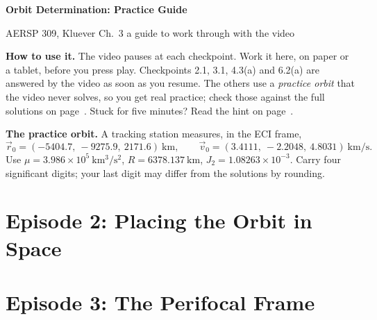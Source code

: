 \documentclass[11pt]{article}
\newcommand{\km}{\ \mathrm{km}}
\newcommand{\kms}{\ \mathrm{km/s}}
\begin{document}
{\LARGE\bfseries Orbit Determination: Practice Guide}\par
{\color{mtkmuted} AERSP 309, Kluever Ch.~3 \textperiodcentered{} a guide to work through with the video}\par\medskip

\textbf{How to use it.} The video pauses at each checkpoint. Work it here, on paper or a tablet, before you
press play. Checkpoints 2.1, 3.1, 4.3(a) and 6.2(a) are answered by the video as soon as you resume. The
others use a \emph{practice orbit} that the video never solves, so you get real practice; check
those against the full solutions on page~\pageref{solutions}. Stuck for five minutes? Read the hint on
page~\pageref{hints}.

\textbf{The practice orbit.} A tracking station measures, in the ECI frame,
\[
\vec r_0 = (-5404.7,\ -9275.9,\ 2171.6)\km, \qquad \vec v_0 = (3.4111,\ -2.2048,\ 4.8031)\kms .
\]
Use $\mu = 3.986\times10^5\ \mathrm{km^3/s^2}$, $R = 6378.137\km$, $J_2 = 1.08263\times10^{-3}$. Carry four
significant digits; your last digit may differ from the solutions by rounding.

\section*{Episode 2: Placing the Orbit in Space}


\section*{Episode 3: The Perifocal Frame}

\end{document}
